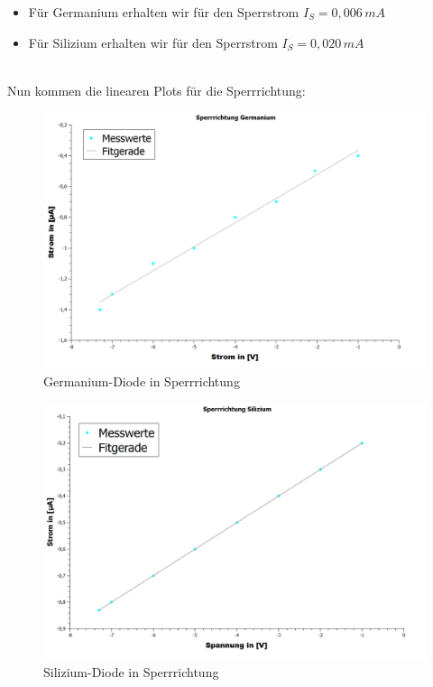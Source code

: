 \documentclass[fontsize=12pt]{scrartcl}
\begin{document}
\begin{itemize}
\item Für Germanium erhalten wir für den Sperrstrom $I_S=0,006\,mA$
\item Für Silizium erhalten wir für den Sperrstrom $I_S=0,020\,mA$
\end{itemize}
\noindent
~\\
Nun kommen die linearen Plots für die Sperrrichtung:\\
\begin{figure}[H]
\centering
\includegraphics[scale=0.4]{Graphik/Germanium_Sperr}
\caption{Germanium-Diode in Sperrrichtung}
\end{figure}
\noindent
\begin{figure}[H]
\centering
\includegraphics[scale=0.4]{Graphik/Silizium_Sperr}
\caption{Silizium-Diode in Sperrrichtung}
\end{figure}
\end{document}
